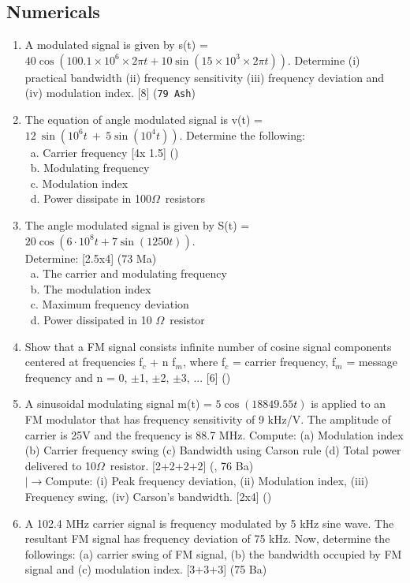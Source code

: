 \documentclass[12pt]{article}
\newcommand{\W}{\(\Omega\)}
\newcommand{\lb}{\\$\left|\rightarrow\right.$}
\newcommand{\enter}{\\\textcolor{white}{1}}
\begin{document}
  \subsection{Numericals}
    \begin{enumerate}
      \item A modulated signal is given by s(t) = $40 \cos(100.1 \times 10^6 \times 2\pi t + 10 \sin(15 \times 10^3 \times 2\pi t))$. Determine (i) practical bandwidth (ii) frequency sensitivity (iii) frequency deviation and (iv) modulation index. \hfil [8] (\texttt{79 Ash})

      \item The equation of angle modulated signal is v(t) = $12\ \sin(10^6t\ +\ 5\sin(10^4t))$. Determine the following:
      \enter a. Carrier frequency \hfill [4x 1.5] ()
      \enter b. Modulating frequency
      \enter c. Modulation index
      \enter d. Power dissipate in 100\W\ resistors

      \item The angle modulated signal is given by S(t) = $20 \cos(6\cdot 10^8t + 7 \sin(1250t))$.\\
      Determine: \hfill [2.5x4] (73 Ma)
      \enter a. The carrier and modulating frequency
      \enter b. The modulation index
      \enter c. Maximum frequency deviation
      \enter d. Power dissipated in 10 \W\ resistor

      \item Show that a FM signal consists infinite number of cosine signal components centered at frequencies f$_c$ + n f$_m$, where f$_c$ = carrier frequency, f$_m$ = message frequency and n = 0, $\pm$1, $\pm$2, $\pm$3, ... \hfill [6] ()

      \item A sinusoidal modulating signal m(t) = $5\cos(18849.55t)$ is applied to an FM modulator that has frequency sensitivity of 9 kHz/V. The amplitude of carrier is 25V and the frequency is 88.7 MHz. Compute: (a) Modulation index (b) Carrier frequency swing (c) Bandwidth using Carson rule (d) Total power delivered to 10\W\ resistor. \hfill [2+2+2+2] (, 76 Ba)
      \lb Compute: (i) Peak frequency deviation, (ii) Modulation index, (iii) Frequency swing, (iv) Carson's bandwidth. \hfill [2x4] ()

      \item A 102.4 MHz carrier signal is frequency modulated by 5 kHz sine wave. The resultant FM signal has frequency deviation of 75 kHz. Now, determine the followings: (a) carrier swing of FM signal, (b) the bandwidth occupied by FM signal and (c) modulation index. \hfill [3+3+3] (75 Ba)


\end{enumerate}
\end{document}
